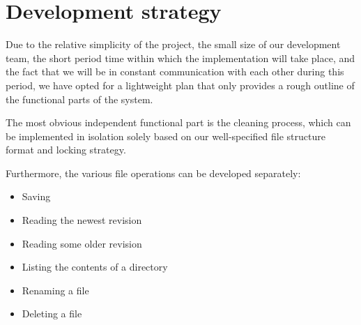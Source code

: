 \documentclass[12pt]{article}
\begin{document}
\section{Development strategy}

Due to the relative simplicity of the project, the small size of our
development team, the short period time within which the
implementation will take place, and the fact that we will be in
constant communication with each other during this period, we have
opted for a lightweight plan that only provides a rough outline of the
functional parts of the system.

The most obvious independent functional part is the cleaning process,
which can be implemented in isolation solely based on our
well-specified file structure format and locking strategy.

Furthermore, the various file operations can be developed separately:

\begin{itemize}
\item Saving
\item Reading the newest revision
\item Reading some older revision
\item Listing the contents of a directory
\item Renaming a file
\item Deleting a file
\end{itemize}



 
\end{document}
